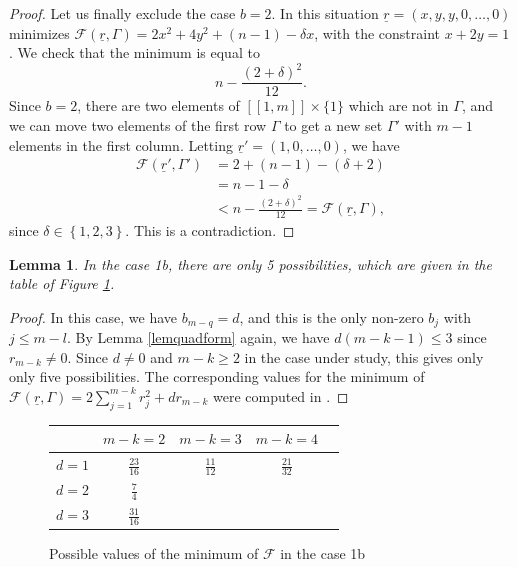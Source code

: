 \documentclass[JEP,XML,SOM,Unicode, NoEqCountersInSection,NoFloatCountersInSection,published]{cedram}
\let\mathcal\mathscr
\newcommand{\llbracket}{[\![}
\newcommand{\rrbracket}{]\!]}
\theoremstyle{theorem}
\newtheorem{lemma}[proposition]{Lemma}
\theoremstyle{definition}
\begin{document}
\begin{proof}
Let us finally exclude the case $b = 2$. In this situation $\underline{r} = (x, y, y, 0,\dots, 0)$ minimizes $\mathcal F(\underline{r}, \Gamma) = 2x^2 + 4y^2 + (n-1) - \delta x$,
with the constraint $x + 2y = 1$. We check that the minimum is equal to
\[
n - \frac{(2 + \delta)^2}{12}.
\]
Since $b = 2$, there are two elements of $\llbracket 1, m \rrbracket \times \{1 \}$ which are not in $\Gamma$, and we can move two elements of the first row $\Gamma$ to get a new set $\Gamma'$ with $m-1$ elements in the first column. Letting $\underline{r}' = (1, 0,\dots, 0)$, we have
\[
\begin{aligned}
\mathcal F(\underline{r}', \Gamma') & = 2 + (n-1) - (\delta + 2) \\
& = n - 1 - \delta \\
& < n - \frac{(2 + \delta)^2}{12} = \mathcal F(\underline{r}, \Gamma),
\end{aligned}
\]
since $\delta \in \left\{ 1, 2, 3 \right\}$. This is a contradiction.
\end{proof}

\begin{lemma}
In the case 1b, there are only 5 possibilities, which are given in the table of Figure \ref{fig:2}.
\end{lemma}
\begin{proof}
In this case, we have $b_{m-q} = d$, and this is the only non-zero $b_j$ with $j \leq m - l$. By Lemma \ref{lemquadform} again, we have $d(m - k - 1) \leq 3$ since $r_{m-k} \neq 0$. Since $d \neq 0$ and $m-k \geq 2$ in the case under study, this gives only only five possibilities. The corresponding values for the minimum of $\mathcal F(\underline{r}, \Gamma) = 2 \sum_{j=1}^{m-k} r_j^2 + d r_{m-k}$ were computed in \cite[Case\,2]{cad18}.
\end{proof}

\begin{figure}[h]
\centering
\renewcommand{\arraystretch}{1.5}
\setlength{\tabcolsep}{5pt}
\begin{tabular}{|c|c|c|c|c|}
\hline
& $m-k=2$ & $m-k = 3$ & $m-k = 4$ \\
\hline
$d =1$ & $\frac{23}{16}$ & $\frac{11}{12}$ & $\frac{21}{32}$ \\
\hline
$d = 2$ & $\frac{7}{4}$ & & \\
\hline
$d = 3$ & $\frac{31}{16}$ & & \\
\hline
\end{tabular}
\caption{\label{fig:2}Possible values of the minimum of $\mathcal F$ in the case 1b}
\end{figure}
\end{document}
